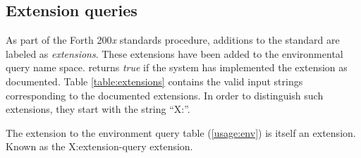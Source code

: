 \ifrelease\else
\subsection{Extension queries} %
\label{usage:extensions}

As part of the Forth 200\emph{x} standards procedure, additions to the
standard are labeled as \emph{extensions}. These extensions have
been added to the environmental query name space. 
returns \emph{true} if the system has implemented the extension as
documented. Table \ref{table:extensions} contains the valid input
strings corresponding to the documented extensions. In order to
distinguish such extensions, they start with the string
``\textsf{X:}''.

The extension to the environment query table (\ref{usage:env}) is
itself an extension. Known as the \textsf{X:extension-query} extension.


